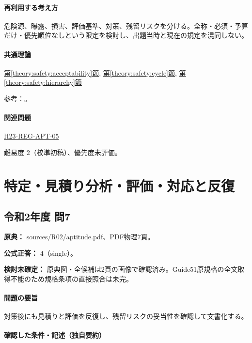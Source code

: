 \paragraph{再利用する考え方} 危険源、曝露、損害、評価基準、対策、残留リスクを分ける。全称・必須・予算だけ・優先順位なしという限定を検討し、出題当時と現在の規定を混同しない。

\paragraph{共通理論} \hyperref[theory:safety:acceptability]{第\ref*{theory:safety:acceptability}節}, \hyperref[theory:safety:cycle]{第\ref*{theory:safety:cycle}節}, \hyperref[theory:safety:hierarchy]{第\ref*{theory:safety:hierarchy}節}

\par 参考：\cite{saf_ra2006,saf_guide51}。

\paragraph{関連問題} \hyperref[q:h23-reg-apt-05]{H23-REG-APT-05}

\par 難易度 2（校準初稿）、優先度未評価。

\section{特定・見積り分析・評価・対応と反復}

\subsection{令和2年度 問7}
\label{q:r02-reg-apt-07}

\noindent\textbf{原典：} sources/R02/aptitude.pdf、PDF物理7頁。

\textbf{公式正答：} 4（single）。

\par\textbf{検討未確定：} 原典図・全候補は2頁の画像で確認済み。Guide51原規格の全文取得不能のため規格条項の直接照合は未完。

\paragraph{問題の要旨} 対策後にも見積りと評価を反復し、残留リスクの妥当性を確認して文書化する。

\paragraph{確認した条件・記述（独自要約）}\mbox{}\par

